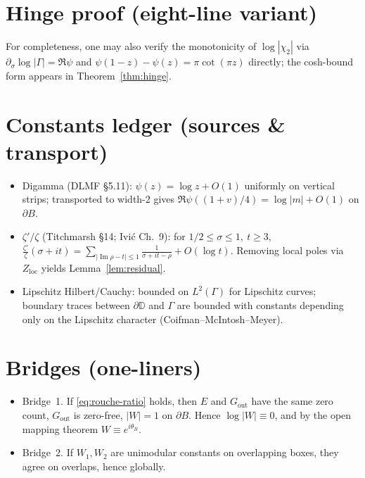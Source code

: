 \documentclass[11pt]{article}
\numberwithin{equation}{section}
\theoremstyle{remark}
\newcommand{\D}{\mathbb{D}}
\DeclareMathOperator{\Imag}{Im}
\newcommand{\Gout}{G_{\mathrm{out}}}
\newcommand{\Zloc}{Z_{\mathrm{loc}}}
\begin{document}

\appendix

\section{Hinge proof (eight-line variant)}
For completeness, one may also verify the monotonicity of $\log|\chi_2|$ via $\partial_\sigma\log|\Gamma|=\Re\psi$ and $\psi(1-z)-\psi(z)=\pi\cot(\pi z)$ directly; the cosh-bound form appears in Theorem~\ref{thm:hinge}.

\section{Constants ledger (sources \& transport)}
\begin{itemize}
\item Digamma (DLMF §5.11): $\psi(z)=\log z+O(1)$ uniformly on vertical strips; transported to width-2 gives $\Re\psi((1+v)/4)=\log|m|+O(1)$ on $\partial B$.
\item $\zeta'/\zeta$ (Titchmarsh §14; Ivi\'c Ch.~9): for $1/2\le \sigma\le 1,\ t\ge 3$,
$\displaystyle \frac{\zeta'}{\zeta}(\sigma+it)=\sum_{|\Imag\rho-t|\le 1}\frac{1}{\sigma+it-\rho}+O(\log t)$.
Removing local poles via $\Zloc$ yields Lemma~\ref{lem:residual}.
\item Lipschitz Hilbert/Cauchy: bounded on $L^2(\Gamma)$ for Lipschitz curves; boundary traces between $\partial\D$ and $\Gamma$ are bounded with constants depending only on the Lipschitz character (Coifman--McIntosh--Meyer).
\end{itemize}

\section{Bridges (one-liners)}
\begin{itemize}
\item Bridge~1. If \eqref{eq:rouche-ratio} holds, then $E$ and $\Gout$ have the same zero count, $\Gout$ is zero-free, $|W|=1$ on $\partial B$. Hence $\log|W|\equiv 0$, and by the open mapping theorem $W\equiv e^{i\theta_B}$.
\item Bridge~2. If $W_1,W_2$ are unimodular constants on overlapping boxes, they agree on overlaps, hence globally.
\end{itemize}
\end{document}
